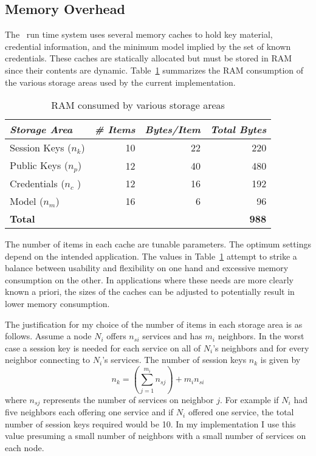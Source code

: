 \subsection{Memory Overhead}
\label{section-sprocket-memory-performance}

The \Sprocket\ run time system uses several memory caches to hold key material, credential
information, and the minimum model implied by the set of known credentials. These caches are
statically allocated but must be stored in RAM since their contents are dynamic.
Table~\ref{table-ram-consumed} summarizes the RAM consumption of the various storage areas used
by the current implementation.

\begin{table}[!t]
  \newcommand\T{\rule{0pt}{2.1ex}}
  \centering
  \caption{RAM consumed by various storage areas}
  {
  \begin{tabular}{|l|r|r|r|} \hline
    \textit{Storage Area} \T & \textit{\# Items} & \textit{Bytes/Item} & \textit{Total Bytes} \\
    \hline \hline

    Session Keys ($n_k$) \T & 10 & 22 & 220 \\ \hline 
    Public Keys ($n_p$)  \T & 12 & 40 & 480 \\ \hline
    Credentials ($n_c$ ) \T & 12 & 16 & 192 \\ \hline
    Model ($n_m$)        \T & 16 &  6 &  96 \\ \hline \hline
    \textbf{Total} \T & \multicolumn{3}{r|}{ \textbf{988} } \\ \hline
  \end{tabular}
  }
  \label{table-ram-consumed}
\end{table}

The number of items in each cache are tunable parameters. The optimum settings depend on the
intended application. The values in Table~\ref{table-ram-consumed} attempt to strike a balance
between usability and flexibility on one hand and excessive memory consumption on the other. In
applications where these needs are more clearly known a priori, the sizes of the caches can be
adjusted to potentially result in lower memory consumption.


The justification for my choice of the number of items in each storage area is as follows.
Assume a node $N_i$ offers $n_{si}$ services and has $m_i$ neighbors. In the worst case a
session key is needed for each service on all of $N_i$'s neighbors and for every neighbor
connecting to $N_i$'s services. The number of session keys $n_k$ is given by
\begin{displaymath}
n_k = \left(\sum_{j = 1}^{m_i} n_{sj}\right) + m_i n_{si}
\end{displaymath}
where $n_{sj}$ represents the number of services on neighbor $j$. For example if $N_i$ had five
neighbors each offering one service and if $N_i$ offered one service, the total number of
session keys required would be 10. In my implementation I use this value presuming a small
number of neighbors with a small number of services on each node.

